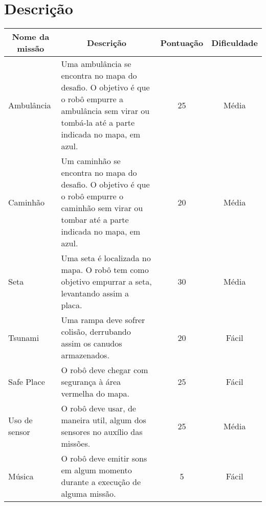 \section{Descrição}

\begin{table}[h]
\begin{tabular}{|l|p{8cm}|c|c|}
\hline
\multicolumn{1}{|c|}{\textbf{Nome da missão}} & \multicolumn{1}{c|}{\textbf{Descrição}}                                                                                                                  & \multicolumn{1}{c|}{\textbf{Pontuação}} & \multicolumn{1}{c|}{\textbf{Dificuldade}} \\ \hline
Ambulância                                    & Uma ambulância se encontra no mapa do desafio. O objetivo é que o robô empurre a ambulância sem virar ou tombá-la até a parte indicada no mapa, em azul. & 25                                      & Média                                     \\ \hline
Caminhão                                      & Um caminhão se encontra no mapa do desafio. O objetivo é que o robô empurre o caminhão sem virar ou tombar até a parte indicada no mapa, em azul.        & 20                                      & Média                                     \\ \hline
Seta                                          & Uma seta é localizada no mapa. O robô tem como objetivo empurrar a seta, levantando assim a placa.                                                       & 30                                      & Média                                     \\ \hline
Tsunami                                       & Uma rampa deve sofrer colisão, derrubando assim os canudos armazenados.                                                       & 20                                      & Fácil                                     \\ \hline
Safe Place                                    & O robô deve chegar com segurança à área vermelha do mapa.                                     & 25                                      & Fácil                                     \\ \hline
Uso de sensor                                 & O robô deve usar, de maneira util, algum dos sensores no auxílio das missões.                                     & 25                                      & Média                                     \\ \hline
Música                                 & O robô deve emitir sons em algum momento durante a execução de alguma missão.                                     & 5                                      & Fácil                                     \\ \hline

\end{tabular}
\end{table}
